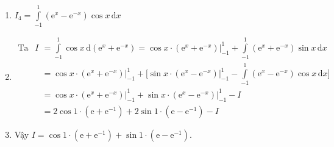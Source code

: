 \begin{bt}
{\begin{enumerate}
			\item $I_4=\displaystyle \int \limits_{-1}^{1} \left(\mathrm{e}^{x}-\mathrm{e}^{-x} \right) \cos{x}\mathrm{\,d}x$
			\item[] $\begin{aligned} \text{Ta có: }
			\displaystyle I &=\int\limits_{-1}^{1} \cos x \mathrm{\,d} \left(\mathrm{e}^{x}+\mathrm{e}^{-x} \right)=\cos x\cdot \left(\mathrm{e}^{x}+\mathrm{e}^{-x} \right)\Big|_{-1}^{1}+\int\limits_{-1}^{1} \left(\mathrm{e}^{x}+\mathrm{e}^{-x} \right) \sin{x} \mathrm{\,d} x \\& =\cos x\cdot \left(\mathrm{e}^{x}+\mathrm{e}^{-x} \right)\Big|_{-1}^{1}+\Bigg[ \sin x\cdot \left(\mathrm{e}^{x}-\mathrm{e}^{-x} \right)\Big|_{-1}^{1}-\int\limits_{-1}^{1} \left(\mathrm{e}^{x}-\mathrm{e}^{-x} \right) \cos{x} \mathrm{\,d} x\Bigg]\\&=\cos x\cdot \left(\mathrm{e}^{x}+\mathrm{e}^{-x} \right)\Big|_{-1}^{1}+\sin x\cdot \left(\mathrm{e}^{x}-\mathrm{e}^{-x} \right)\Big|_{-1}^{1}-I\\&=2\cos 1\cdot(\mathrm{e}+\mathrm{e}^{-1})+2\sin 1\cdot(\mathrm{e}-\mathrm{e}^{-1})-I
			\end{aligned}$
			\item[] Vậy $I=\cos 1\cdot(\mathrm{e}+\mathrm{e}^{-1})+\sin 1\cdot(\mathrm{e}-\mathrm{e}^{-1})$.
		\end{enumerate}
	}
\end{bt}

